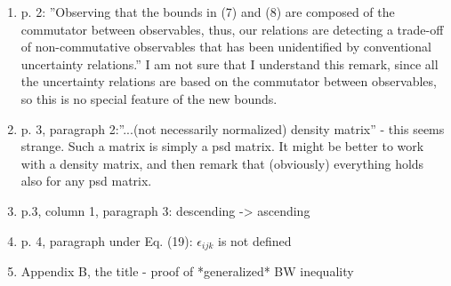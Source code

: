 \documentclass[12pt]{article}
\begin{document}
\begin{enumerate}
\item p. 2: ''Observing that the bounds in (7) and (8) are composed of
the commutator between observables, thus, our relations
are detecting a trade-off of non-commutative observables
that has been unidentified by conventional uncertainty
relations.'' I am not sure that I understand this remark, since all the uncertainty
relations are based on the commutator between observables, so this is no special feature
of the new bounds.

\item p. 3, paragraph 2:''...(not necessarily normalized) density matrix'' - this seems strange. Such a matrix is simply a
psd matrix. It might be better to work with a density matrix, and then remark that
(obviously) everything  holds also for any psd matrix. 

\item p.3, column 1, paragraph 3: descending -> ascending

\item p. 4, paragraph under Eq. (19): $\epsilon_{ijk}$ is not defined

\item Appendix B, the title - proof of *generalized* BW inequality 

\end{enumerate}
\end{document}
